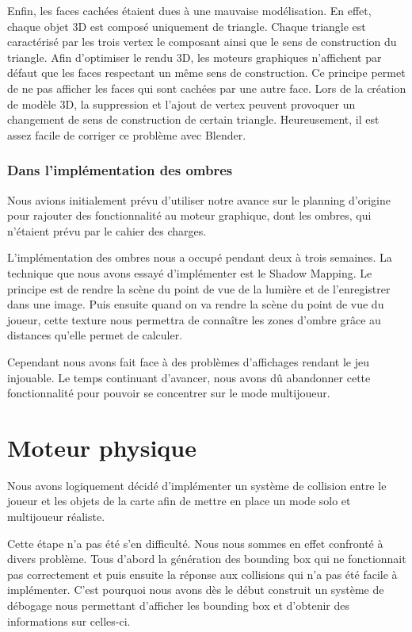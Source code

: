 \documentclass[11pt]{report}
\begin{document}
Enfin, les faces cachées étaient dues à une mauvaise modélisation. En effet, chaque objet 3D est composé uniquement de triangle. Chaque triangle est caractérisé par les trois vertex le composant ainsi que le sens de construction du triangle. Afin d'optimiser le rendu 3D, les moteurs graphiques n'affichent par défaut que les faces respectant un même sens de construction. Ce principe permet de ne pas afficher les faces qui sont cachées par une autre face. Lors de la création de modèle 3D, la suppression et l'ajout de vertex peuvent provoquer un changement de sens de construction de certain triangle. Heureusement, il est assez facile de corriger ce problème avec Blender.

\subsection{Dans l'implémentation des ombres}

Nous avions initialement prévu d'utiliser notre avance sur le planning d'origine pour rajouter des fonctionnalité au moteur graphique, dont les ombres, qui n'étaient prévu par le cahier des charges.

L'implémentation des ombres nous a occupé pendant deux à trois semaines. La technique que nous avons essayé d'implémenter est le Shadow Mapping. Le principe est de rendre la scène du point de vue de la lumière et de l'enregistrer dans une image. Puis ensuite quand on va rendre la scène du point de vue du joueur, cette texture nous permettra de connaître les zones d'ombre grâce au distances qu'elle permet de calculer.

Cependant nous avons fait face à des problèmes d'affichages rendant le jeu injouable. Le temps continuant d'avancer, nous avons dû abandonner cette fonctionnalité pour pouvoir se concentrer sur le mode multijoueur.

\chapter{Moteur physique}

Nous avons logiquement décidé d’implémenter un système de collision entre le joueur et les objets de la carte afin de mettre en place un mode solo et multijoueur réaliste.

Cette étape n'a pas été s'en difficulté. Nous nous sommes en effet confronté à divers problème. Tous d'abord la génération des bounding box qui ne fonctionnait pas correctement et puis ensuite la réponse aux collisions qui n'a pas été facile à implémenter. C'est pourquoi nous avons dès le début construit un système de débogage nous permettant d'afficher les bounding box et d'obtenir des informations sur celles-ci.
\end{document}
